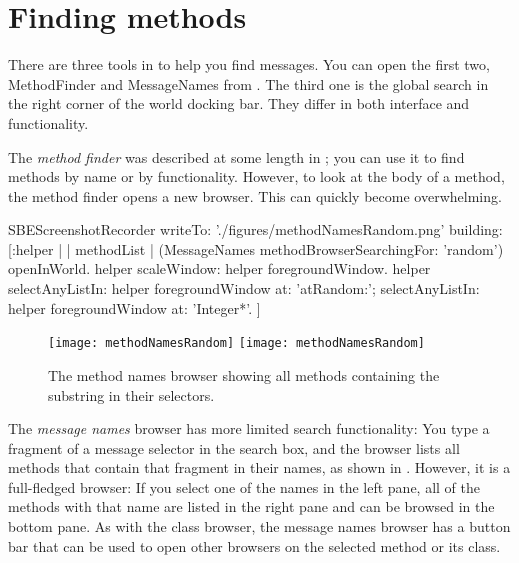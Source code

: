 \documentclass[a4paper,10pt,twoside]{book}
\begin{document}

\section{Finding methods}
\label{sec:methodFinder}

There are three tools in \sq to help you find messages. You can open the first two, MethodFinder and MessageNames from . The third one is the global search in the right corner of the world docking bar.
They differ in both interface and functionality.

The \emph{method finder} was described at some length in ; you can use it to find methods by name or by functionality.
However, to look at the body of a method, the method finder opens a new browser.
This can quickly become overwhelming.

\begin{ExecuteSmalltalkScript}
SBEScreenshotRecorder writeTo: './figures/methodNamesRandom.png' building: [:helper |
	| methodList |
	(MessageNames methodBrowserSearchingFor: 'random') openInWorld.
	helper scaleWindow: helper foregroundWindow.
	helper
		selectAnyListIn: helper foregroundWindow at: 'atRandom:';
		selectAnyListIn: helper foregroundWindow at: 'Integer*'.
]
\end{ExecuteSmalltalkScript}
\begin{figure}[btp]
	\begin{center}
	\ifluluelse
		{\texttt{[image: methodNamesRandom]}}
		{\texttt{[image: methodNamesRandom]}}
	\end{center}
	\caption{The method names browser showing all methods containing the substring  in their selectors.}
	\label{fig:methodNamesRandom}
\end{figure}

The \emph{message names} browser has more limited search functionality:
You type a fragment of a message selector in the search box, and the browser lists all methods that contain that fragment in their names, as shown in .
However, it is a full-fledged browser:
If you select one of the names in the left pane, all of the methods with that name are listed in the right pane and can be browsed in the bottom pane.
As with the class browser, the message names browser has a button bar that can be used to open other  browsers on the selected method or its class.
\end{document}
